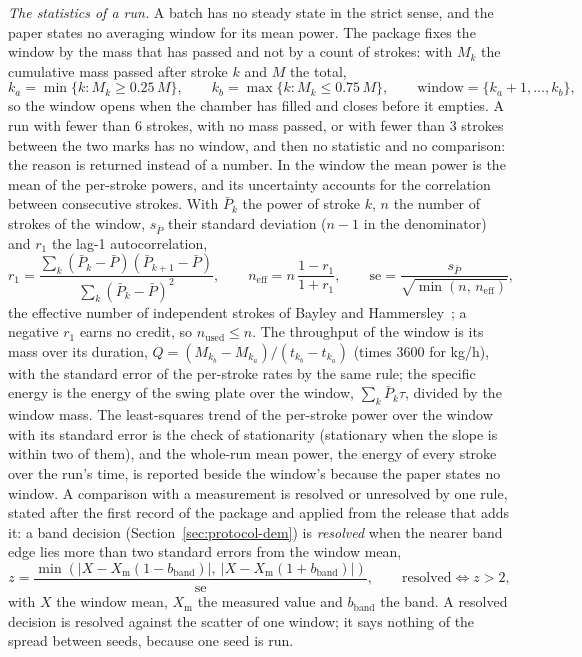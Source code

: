 \emph{The statistics of a run.} A batch has no steady state in the strict sense, and the paper states no averaging window for its mean power. The package fixes the window by the mass that has passed and not by a count of strokes: with $M_k$ the cumulative mass passed after stroke $k$ and $M$ the total,
\begin{equation}
k_a=\min\{k: M_k\ge 0.25\,M\},\qquad k_b=\max\{k: M_k\le0.75\,M\},\qquad \text{window}=\{k_a+1,\dots,k_b\},
\label{eq:dem-window}
\end{equation}
so the window opens when the chamber has filled and closes before it empties. A run with fewer than $6$ strokes, with no mass passed, or with fewer than $3$ strokes between the two marks has no window, and then no statistic and no comparison: the reason is returned instead of a number. In the window the mean power
is the mean of the per-stroke powers, and its uncertainty accounts for the correlation between consecutive strokes. With $\bar P_k$ the power of stroke $k$, $n$ the number of strokes of the window, $s_{\bar P}$ their standard deviation ($n-1$ in the denominator) and $r_1$ the lag-1 autocorrelation,
\begin{equation}
r_1=\frac{\sum_{k}(\bar P_k-\bar P)(\bar P_{k+1}-\bar P)}{\sum_{k}(\bar P_k-\bar P)^2},\qquad n_{\mathrm{eff}}=n\,\frac{1-r_1}{1+r_1},\qquad \mathrm{se}=\frac{s_{\bar P}}{\sqrt{\min(n,\,n_{\mathrm{eff}})}},
\label{eq:dem-stats}
\end{equation}
the effective number of independent strokes of Bayley and Hammersley~\cite{bayley1946}; a negative $r_1$ earns no credit, so $n_{\mathrm{used}}\le n$. The throughput of the window is its mass over its duration, $Q=(M_{k_b}-M_{k_a})/(t_{k_b}-t_{k_a})$ (times $3600$ for kg/h), with the standard error of the per-stroke rates by the same rule; the specific energy is the energy of the swing plate over the
window, $\sum_k\bar P_k\tau$, divided by the window mass. The least-squares trend of the per-stroke power over the window with its standard error is the check of stationarity (stationary when the slope is within two of them), and the whole-run mean power, the energy of every stroke over the run's time, is reported beside the window's because the paper states no window. A comparison with a measurement is resolved or unresolved
by one rule, stated after the first record of the package and applied from the release that adds it: a band decision (Section~\ref{sec:protocol-dem}) is \emph{resolved} when the nearer band edge lies more than two standard errors from the window mean,
\begin{equation}
z=\frac{\min\left(\lvert X-X_{\mathrm m}(1-b_{\mathrm{band}})\rvert,\ \lvert X-X_{\mathrm m}(1+b_{\mathrm{band}})\rvert\right)}{\mathrm{se}},\qquad \text{resolved}\iff z>2 ,
\label{eq:dem-resolved}
\end{equation}
with $X$ the window mean, $X_{\mathrm m}$ the measured value and $b_{\mathrm{band}}$ the band. A resolved decision is resolved against the scatter of one window; it says nothing of the spread between seeds, because one seed is run.

